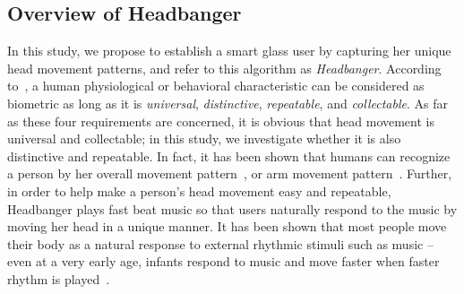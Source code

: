 \subsection{Overview of Headbanger}
In this study, we propose to establish a smart glass user by capturing her unique head movement patterns, and refer to this algorithm as \emph{Headbanger}. According to~\cite{jain2004introduction}, a human physiological or behavioral characteristic can be considered as biometric as long as it is \emph{universal}, \emph{distinctive}, \emph{repeatable}, and \emph{collectable}. As far as these four requirements are concerned, it is obvious that head movement is universal and collectable; in this study, we investigate whether it is also distinctive and repeatable. In fact, it has been shown that humans can recognize a person by her overall movement pattern~\cite{loula2005recognizing}, or arm movement pattern~\cite{okumura2006study}. Further, in order to help make a person's head movement easy and repeatable, Headbanger plays fast beat music so that users naturally respond to the music by moving her head in a unique manner.  It has been shown that most people move their body as a natural response to external rhythmic stimuli such as music -- even at a very early age, infants respond to music and move faster when faster rhythm is played~\cite{zentner2010rhythmic}.

